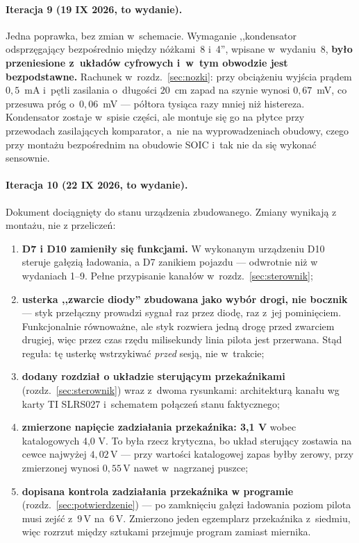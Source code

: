 \documentclass[a4paper,11pt]{article}
\newcommand{\volt}{\,\mathrm{V}}
\begin{document}
\paragraph{Iteracja 9 (19 IX 2026, to wydanie).} Jedna poprawka, bez zmian
w~schemacie. Wymaganie ,,kondensator odsprzęgający bezpośrednio między nóżkami~8
i~4'', wpisane w~wydaniu~8, \textbf{było przeniesione z~układów cyfrowych i~w~tym
obwodzie jest bezpodstawne.} Rachunek w~rozdz.~\ref{sec:nozki}: przy obciążeniu
wyjścia prądem $0{,}5$~mA i~pętli zasilania o~długości $20$~cm zapad na szynie
wynosi $0{,}67$~mV, co przesuwa próg o~$0{,}06$~mV --- półtora tysiąca razy mniej
niż histereza. Kondensator zostaje w~spisie części, ale montuje się go na płytce
przy przewodach zasilających komparator, a~nie na wyprowadzeniach obudowy, czego
przy montażu bezpośrednim na obudowie SOIC i~tak nie da się wykonać sensownie.

\paragraph{Iteracja 10 (22 IX 2026, to wydanie).} Dokument dociągnięty do stanu
urządzenia zbudowanego. Zmiany wynikają z montażu, nie z przeliczeń:

\begin{enumerate}
\item \textbf{D7 i D10 zamieniły się funkcjami.} W wykonanym urządzeniu D10 steruje
      gałęzią ładowania, a D7 zanikiem pojazdu --- odwrotnie niż w wydaniach 1--9.
      Pełne przypisanie kanałów w~rozdz.~\ref{sec:sterownik};
\item \textbf{usterka ,,zwarcie diody'' zbudowana jako wybór drogi, nie bocznik} ---
      styk przełączny prowadzi sygnał raz przez diodę, raz z~jej pominięciem.
      Funkcjonalnie równoważne, ale styk rozwiera jedną drogę przed zwarciem
      drugiej, więc przez czas rzędu milisekundy linia pilota jest przerwana.
      Stąd reguła: tę usterkę wstrzykiwać \emph{przed} sesją, nie w~trakcie;
\item \textbf{dodany rozdział o układzie sterującym przekaźnikami}
      (rozdz.~\ref{sec:sterownik}) wraz z~dwoma rysunkami: architekturą kanału wg
      karty TI SLRS027 i~schematem połączeń stanu faktycznego;
\item \textbf{zmierzone napięcie zadziałania przekaźnika: 3,1 V} wobec katalogowych
      4,0 V. To była rzecz krytyczna, bo układ sterujący zostawia na cewce najwyżej
      $4{,}02\volt$ --- przy wartości katalogowej zapas byłby zerowy, przy zmierzonej
      wynosi $0{,}55\volt$ nawet w~nagrzanej puszce;
\item \textbf{dopisana kontrola zadziałania przekaźnika w programie}
      (rozdz.~\ref{sec:potwierdzenie}) --- po zamknięciu gałęzi ładowania poziom
      pilota musi zejść z~$9\volt$ na~$6\volt$. Zmierzono jeden egzemplarz
      przekaźnika z~siedmiu, więc rozrzut między sztukami przejmuje program zamiast
      miernika.
\end{enumerate}
\end{document}
